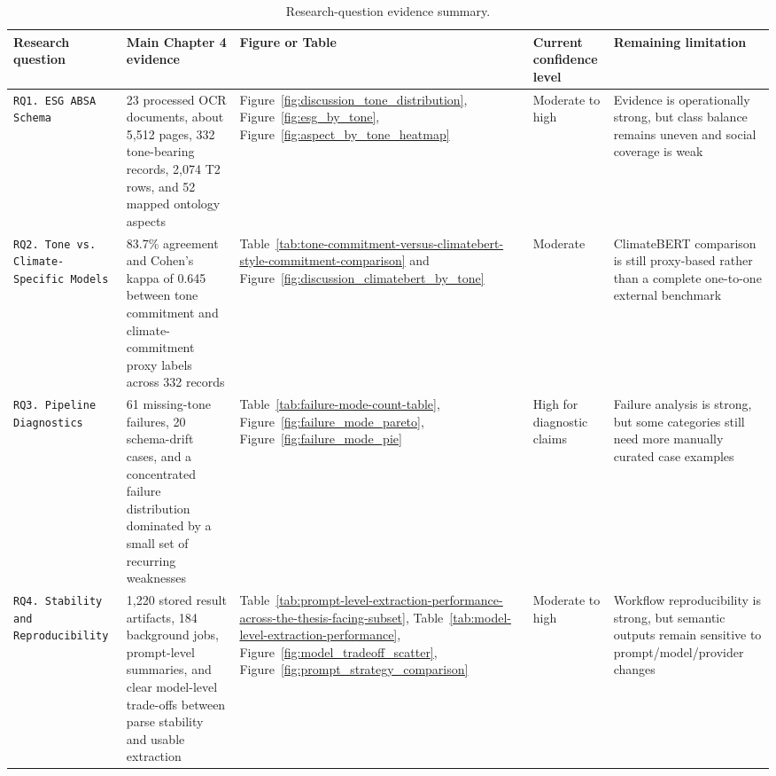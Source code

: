\documentclass[english, online, cse, master]{dithesis}
\begin{document}
\begin{table}[htbp]
\centering
\caption{Research-question evidence summary.}
\label{tab:research-question-evidence-summary}
\footnotesize
\setlength{\tabcolsep}{4pt}
\renewcommand{\arraystretch}{1.15}
\begin{tabularx}{\linewidth}{|p{2cm}|X|p{2cm}|p{2cm}|X|}
\hline
\textbf{Research question} & \textbf{Main Chapter 4 evidence} & \textbf{Figure or Table} & \textbf{Current confidence level} & \textbf{Remaining limitation} \\ \hline
\texttt{RQ1. ESG ABSA Schema} & 23 processed OCR documents, about 5,512 pages, 332 tone-bearing records, 2,074 T2 rows, and 52 mapped ontology aspects & Figure~\ref{fig:discussion_tone_distribution}, Figure~\ref{fig:esg_by_tone}, Figure~\ref{fig:aspect_by_tone_heatmap} & Moderate to high & Evidence is operationally strong, but class balance remains uneven and social coverage is weak \\ \hline
\texttt{RQ2. Tone vs. Climate-Specific Models} & 83.7\% agreement and Cohen's kappa of 0.645 between tone commitment and climate-commitment proxy labels across 332 records & Table~\ref{tab:tone-commitment-versus-climatebert-style-commitment-comparison} and Figure~\ref{fig:discussion_climatebert_by_tone} & Moderate & ClimateBERT comparison is still proxy-based rather than a complete one-to-one external benchmark \\ \hline
\texttt{RQ3. Pipeline Diagnostics} & 61 missing-tone failures, 20 schema-drift cases, and a concentrated failure distribution dominated by a small set of recurring weaknesses & Table~\ref{tab:failure-mode-count-table}, Figure~\ref{fig:failure_mode_pareto}, Figure~\ref{fig:failure_mode_pie} & High for diagnostic claims & Failure analysis is strong, but some categories still need more manually curated case examples \\ \hline
\texttt{RQ4. Stability and Reproducibility} & 1,220 stored result artifacts, 184 background jobs, prompt-level summaries, and clear model-level trade-offs between parse stability and usable extraction & Table~\ref{tab:prompt-level-extraction-performance-across-the-thesis-facing-subset}, Table~\ref{tab:model-level-extraction-performance}, Figure~\ref{fig:model_tradeoff_scatter}, Figure~\ref{fig:prompt_strategy_comparison} & Moderate to high & Workflow reproducibility is strong, but semantic outputs remain sensitive to prompt/model/provider changes \\ \hline
\end{tabularx}
\end{table}
\end{document}
